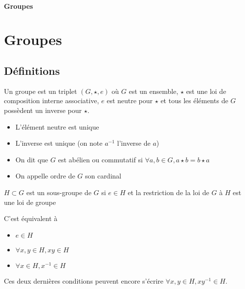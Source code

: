 \ifsolo
    ~

    \vspace{1cm}

    \begin{center}
        \textbf{\LARGE Groupes} \\[1em]
    \end{center}
    \tableofcontents
\else
    \chapter{Groupes}

    \minitoc
\fi
\thispagestyle{empty}

\section{Définitions}

\begin{dfn}
    Un groupe est un triplet $(G, \star, e)$ où  $G$ est un ensemble,  $\star$ est une loi de composition interne associative,  $e$ est neutre pour  $\star$ et tous les éléments de  $G$ possèdent un inverse pour  $\star$.
\end{dfn}

\begin{rem}
\begin{itemize}
    \item L'élément neutre est unique
    \item L'inverse est unique (on note $a ^{-1}$ l'inverse de $a$)
    \item On dit que $G$ est abélien ou commutatif si $ \forall  a,b \in  G, a\star b=b\star a$
    \item On appelle ordre de $G$ son cardinal
\end{itemize}
\end{rem}

\begin{dfn}
    $H\subset G$ est un sous-groupe de  $G$ si  $e \in  H$ et la restriction de la loi de $G$ à  $H$ est une loi de groupe
\end{dfn}

\begin{rem}
C'est équivalent à \begin{itemize}
    \item $e \in  H$
    \item $\forall  x,y \in  H, xy \in H$
    \item $\forall  x \in  H, x^{-1} \in  H$
\end{itemize}
Ces deux dernières conditions peuvent encore s'écrire $\forall  x,y \in  H, xy^{-1}\in H$.
\end{rem}

